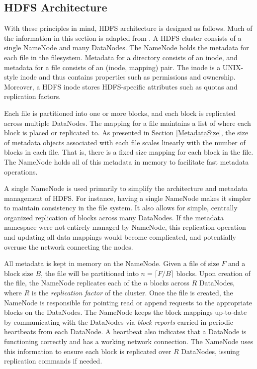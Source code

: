 \documentclass[11pt, a4paper]{article}
\begin{document}
\begin{multicols*}{2}
\section{HDFS Architecture}
With these principles in mind, HDFS architecture is designed as follows. Much of the information in this section is adapted from \cite{HdfsArch}. A HDFS cluster consists of a single NameNode and many DataNodes. The NameNode holds the metadata for each file in the filesystem. Metadata for a directory consists of an inode, and metadata for a file consists of an (inode, mapping) pair. The inode is a UNIX-style inode and thus contains properties such as permissions and ownership. Moreover, a HDFS inode stores HDFS-specific attributes such as quotas and replication factors.

Each file is partitioned into one or more blocks, and each block is replicated across multiple DataNodes. The mapping for a file maintains a list of where each block is placed or replicated to. As presented in Section \ref{MetadataSize}, the size of metadata objects associated with each file scales linearly with the number of blocks in each file. That is, there is a fixed size mapping for each block in the file. The NameNode holds all of this metadata in memory to facilitate fast metadata operations.

A single NameNode is used primarily to simplify the architecture and metadata management of HDFS. For instance, having a single NameNode makes it simpler to maintain consistency in the file system. It also allows for simple, centrally organized replication of blocks across many DataNodes. If the metadata namespace were not entirely managed by NameNode, this replication operation and updating all data mappings would become complicated, and potentially overuse the network connecting the nodes.

All metadata is kept in memory on the NameNode. Given a file of size $F$ and a block size $B$, the file will be partitioned into $n = \lceil F/B\rceil$ blocks. Upon creation of the file, the NameNode replicates each of the $n$ blocks across $R$ DataNodes, where $R$ is the \textit{replication factor} of the cluster. Once the file is created, the NameNode is responsible for pointing read or append requests to the appropriate blocks on the DataNodes. The NameNode keeps the block mappings up-to-date by communicating with the DataNodes via \textit{block reports} carried in periodic heartbeats from each DataNode. A heartbeat also indicates that a DataNode is functioning correctly and has a working network connection. The NameNode uses this information to ensure each block is replicated over $R$ DataNodes, issuing replication commands if needed.


\end{multicols*}
\end{document}
